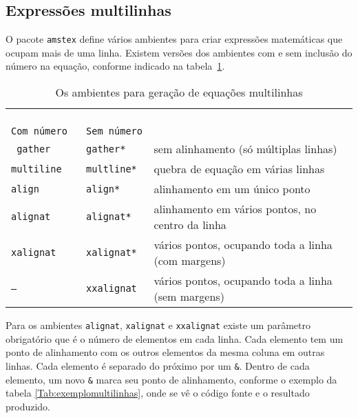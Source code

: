\subsection{Expressões multilinhas}
\label{Sec:multilinhas}

O pacote \texttt{amstex} define vários ambientes para criar expressões
matemáticas que ocupam mais de uma linha. Existem versões dos
ambientes com e sem inclusão do número na equação, conforme indicado
na tabela~\ref{Tab:multilinhas}\footnotemark.

\begin{table}[htbp]
\begin{center}
\newlength{\LL}
\settowidth{\LL}{Tipo de alinhamento}
\begin{tabular}{|>{\tt}l|>{\tt}l|l|} \hline
\multicolumn{2}{|c|}{PACOTE} &
\multicolumn{1}{c|}{\multirow{2}{\LL}{Tipo de alinhamento}}
\\ \cline{1-2}
\textrm{Com número} & \textrm{Sem número} &  \\ \hline
gather & gather* & sem alinhamento (só múltiplas linhas) \\
multiline & multline* & quebra de equação em várias linhas \\
align & align* & alinhamento em um único ponto \\
alignat & alignat* & alinhamento em vários pontos, no centro da linha\\
xalignat & xalignat* & vários pontos, ocupando toda a linha (com margens)\\
-- & xxalignat & vários pontos, ocupando toda a linha (sem margens)
\\ \hline
\end{tabular}
\end{center}
\caption{Os ambientes para geração de equações multilinhas}
\label{Tab:multilinhas}
\end{table}

Para os ambientes \texttt{alignat}, \texttt{xalignat} e
\texttt{xxalignat} existe um parâmetro obrigatório que é o número de
elementos em cada linha. Cada elemento tem um ponto de alinhamento com
os outros elementos da mesma coluna em outras linhas.  Cada elemento é
separado do próximo por um \texttt{\&}. Dentro de cada elemento, um
novo \texttt{\&} marca seu ponto de alinhamento, conforme o exemplo da
tabela \ref{Tab:exemplomultilinhas}, onde se vê o código fonte e o
resultado produzido.

